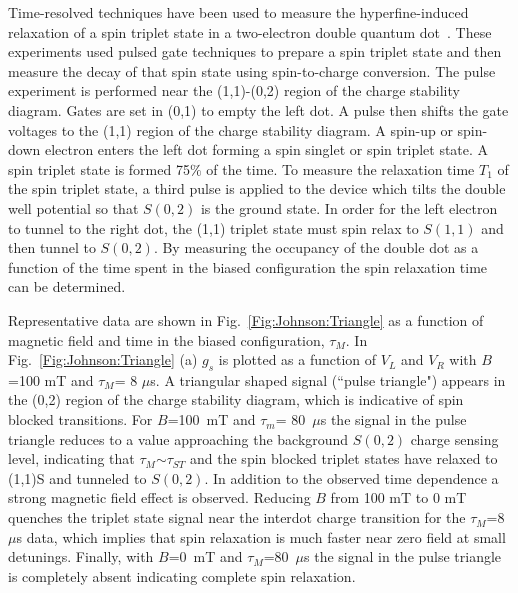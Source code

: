 \documentclass[rmp,twocolumn,aps]{revtex4}
\begin{document}
Time-resolved techniques have been used to measure the hyperfine-induced relaxation
of a spin triplet state in a two-electron double quantum
dot~\cite{Petta_ST,johnson05}. These experiments used pulsed gate
techniques to prepare a spin triplet state and then measure the
decay of that spin state using spin-to-charge conversion. The
pulse experiment is performed near the (1,1)-(0,2) region of the
charge stability diagram. Gates are set in (0,1) to empty the left
dot. A pulse then shifts the gate voltages to the (1,1) region of
the charge stability diagram. A spin-up or spin-down electron
enters the left dot forming a spin singlet or spin triplet state.
A spin triplet state is formed 75$\%$ of the time. To measure the relaxation time $T_1$ of the spin triplet state, a
third pulse is applied to the device which tilts the double well
potential so that $S(0,2)$ is the ground state. In order for the
left electron to tunnel to the right dot, the (1,1) triplet state
must spin relax to $S(1,1)$ and then tunnel to $S(0,2)$. By
measuring the occupancy of the double dot as a function of the
time spent in the biased configuration the spin relaxation time can be
determined.

Representative data are shown in Fig.\ \ref{Fig:Johnson:Triangle}
as a function of magnetic field and time in the biased
configuration, $\tau_M$. In Fig.\ \ref{Fig:Johnson:Triangle} (a)
$g_s$ is plotted as a function of $V_L$ and $V_R$ with $B$=100 mT
and $\tau_M$= 8 $\mu$s. A triangular shaped signal (``pulse
triangle") appears in the (0,2) region of the charge stability
diagram, which is indicative of spin blocked transitions. For
$B$=100~mT and $\tau_m$= 80~$\mu$s the signal in the pulse
triangle reduces to a value approaching the background $S(0,2)$
charge sensing level, indicating that $\tau_M$$\sim$$\tau_{ST}$
and the spin blocked triplet states have relaxed to (1,1)S and
tunneled to $S(0,2)$. In addition to the observed time dependence
a strong magnetic field effect is observed. Reducing $B$ from 100
mT to 0 mT quenches the triplet state signal near the interdot
charge transition for the $\tau_M$=8~$\mu$s data, which implies
that spin relaxation is much faster near zero field at small
detunings. Finally, with $B$=0~mT and $\tau_M$=80~$\mu$s the
signal in the pulse triangle is completely absent indicating
complete spin relaxation.
\end{document}
